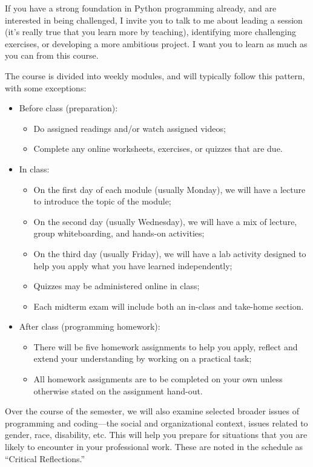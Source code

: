 \documentclass[11pt]{article}
\begin{document}
If you have a strong foundation in Python programming already, and are interested in being challenged, I invite you to talk to me about leading a session (it’s really true that you learn more by teaching), identifying more challenging exercises, or developing a more ambitious project. I want you to learn as much as you can from this course.

The course is divided into weekly modules, and will typically follow this pattern, with some exceptions:

\begin{itemize}
	\item Before class (preparation):
	\begin{itemize}
		\item Do assigned readings and/or watch assigned videos; 
		\item Complete any online worksheets, exercises, or quizzes that are due.
	\end{itemize}
	\item In class:
	\begin{itemize}
		\item On the first day of each module (usually Monday), we will have a lecture to introduce the topic of the module;
		\item On the second day (usually Wednesday), we will have a mix of lecture, group whiteboarding, and hands-on activities;
		\item On the third day (usually Friday), we will have a lab activity designed to help you apply what you have learned independently;
		\item Quizzes may be administered online in class;
		\item Each midterm exam will include both an in-class and take-home section.
	\end{itemize}
	\item After class (programming homework):
	\begin{itemize}
		\item There will be five homework assignments to help you apply, reflect and extend your understanding by working on a practical task;
		\item	All homework assignments are to be completed on your own unless otherwise stated on the assignment hand-out.
	\end{itemize}
\end{itemize}

Over the course of the semester, we will also examine selected broader issues of programming and coding–--the social and organizational context, issues related to gender, race, disability, etc. This will help you prepare for situations that you are likely to encounter in your professional work. These are noted in the schedule as “Critical Reflections.”
\end{document}
